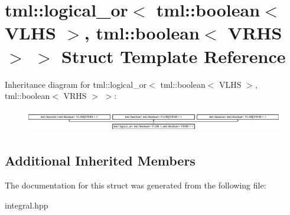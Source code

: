 \hypertarget{structtml_1_1logical__or_3_01tml_1_1boolean_3_01VLHS_01_4_00_01tml_1_1boolean_3_01VRHS_01_4_01_4}{\section{tml\+:\+:logical\+\_\+or$<$ tml\+:\+:boolean$<$ V\+L\+H\+S $>$, tml\+:\+:boolean$<$ V\+R\+H\+S $>$ $>$ Struct Template Reference}
\label{structtml_1_1logical__or_3_01tml_1_1boolean_3_01VLHS_01_4_00_01tml_1_1boolean_3_01VRHS_01_4_01_4}
}
Inheritance diagram for tml\+:\+:logical\+\_\+or$<$ tml\+:\+:boolean$<$ V\+L\+H\+S $>$, tml\+:\+:boolean$<$ V\+R\+H\+S $>$ $>$\+:\begin{figure}[H]
\begin{center}
\leavevmode
\includegraphics[height=0.990274cm]{structtml_1_1logical__or_3_01tml_1_1boolean_3_01VLHS_01_4_00_01tml_1_1boolean_3_01VRHS_01_4_01_4}
\end{center}
\end{figure}
\subsection*{Additional Inherited Members}


The documentation for this struct was generated from the following file\+:\begin{DoxyCompactItemize}
\item 
integral.\+hpp\end{DoxyCompactItemize}

